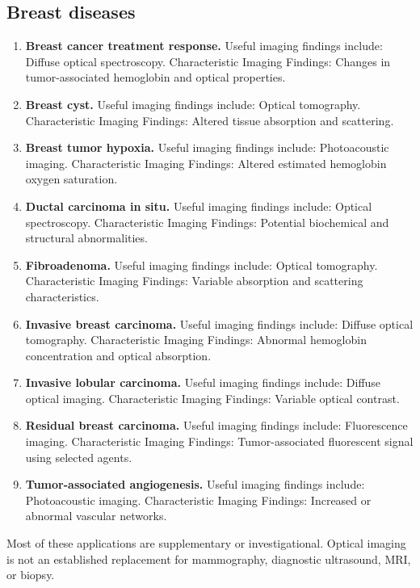 \subsection{Breast diseases}
\begin{enumerate}[leftmargin=*,itemsep=0.45em,topsep=0.4em]
\item \textbf{Breast cancer treatment response.} Useful imaging findings include: Diffuse optical spectroscopy. Characteristic Imaging Findings: Changes in tumor-associated hemoglobin and optical properties.
\item \textbf{Breast cyst.} Useful imaging findings include: Optical tomography. Characteristic Imaging Findings: Altered tissue absorption and scattering.
\item \textbf{Breast tumor hypoxia.} Useful imaging findings include: Photoacoustic imaging. Characteristic Imaging Findings: Altered estimated hemoglobin oxygen saturation.
\item \textbf{Ductal carcinoma in situ.} Useful imaging findings include: Optical spectroscopy. Characteristic Imaging Findings: Potential biochemical and structural abnormalities.
\item \textbf{Fibroadenoma.} Useful imaging findings include: Optical tomography. Characteristic Imaging Findings: Variable absorption and scattering characteristics.
\item \textbf{Invasive breast carcinoma.} Useful imaging findings include: Diffuse optical tomography. Characteristic Imaging Findings: Abnormal hemoglobin concentration and optical absorption.
\item \textbf{Invasive lobular carcinoma.} Useful imaging findings include: Diffuse optical imaging. Characteristic Imaging Findings: Variable optical contrast.
\item \textbf{Residual breast carcinoma.} Useful imaging findings include: Fluorescence imaging. Characteristic Imaging Findings: Tumor-associated fluorescent signal using selected agents.
\item \textbf{Tumor-associated angiogenesis.} Useful imaging findings include: Photoacoustic imaging. Characteristic Imaging Findings: Increased or abnormal vascular networks.
\end{enumerate}
Most of these applications are supplementary or investigational. Optical imaging is not an established replacement for mammography, diagnostic ultrasound, MRI, or biopsy.

